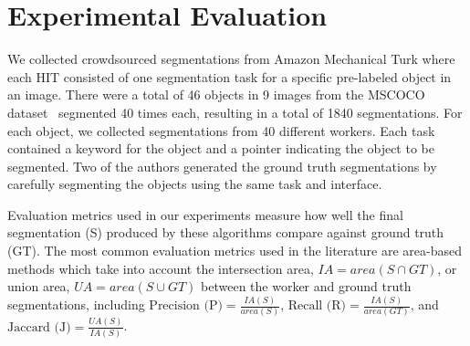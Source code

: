 \section{Experimental Evaluation\label{sec:experiment}}

\par \noindent We collected crowdsourced segmentations from Amazon Mechanical Turk where each HIT consisted of one segmentation task for a specific pre-labeled object in an image. There were a total of 46 objects in 9 images from the MSCOCO dataset~\cite{Lin2014} segmented 40 times each, resulting in a total of 1840 segmentations. For each object, we collected segmentations from 40 different workers. Each task contained a keyword for the object and a pointer indicating the object to be segmented. Two of the authors generated the ground truth segmentations by carefully segmenting the objects using the same task and interface. %

\par \noindent Evaluation metrics used in our experiments measure how well the final segmentation (S) produced by these algorithms compare against ground truth (GT). The most common evaluation metrics used in the literature are area-based methods which take into account the intersection area, $IA=area(S\cap GT)$, or union area, $UA=area(S\cup GT)$ between the worker and ground truth segmentations, including %
    $\text{Precision (P)} = \frac{IA(S)}{area(S)}$, 
    $\text{Recall (R)} = \frac{IA(S)}{area(GT)}$, and 
    $\text{Jaccard (J)} = \frac{UA(S)}{IA(S)}$.

